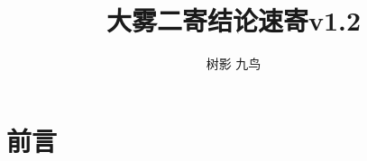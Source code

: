 \documentclass{ctexart}
\author{树影 九鸟}
\title{大雾二寄结论速寄v1.2}
\date{}
\begin{document}
\maketitle
\section{前言}
\end{document}
